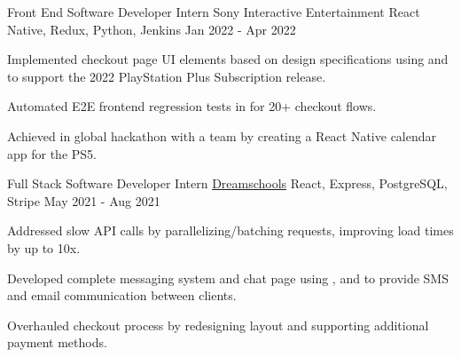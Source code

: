 \begin{cventries}
  \cventry
    {Front End Software Developer Intern} %
    {Sony Interactive Entertainment} %
    {React Native, Redux, Python, Jenkins} %
    {Jan 2022 - Apr 2022} %
    {
      \begin{cvitems} %
        \item {Implemented checkout page UI elements based on design specifications using  and  to support the 2022 PlayStation Plus Subscription release.}
        \item {Automated E2E frontend regression tests in  for 20+ checkout flows.} 
        \item {Achieved  in global hackathon with a team by creating a React Native calendar app for the PS5.}
      \end{cvitems}
    }


  \cventry
    {Full Stack Software Developer Intern} %
    {\href{https://dreamschools.com/}{Dreamschools}} %
    {React, Express, PostgreSQL, Stripe} %
    {May 2021 - Aug 2021} %
    {
      \begin{cvitems} %
        \item {Addressed slow  API calls by parallelizing/batching requests, improving load times by up to 10x.}
        \item {Developed complete messaging system and chat page using ,  and  to provide SMS and email communication between clients.}
        \item {Overhauled checkout process by redesigning layout and supporting additional payment methods.}
      \end{cvitems}
    }
\end{cventries}
